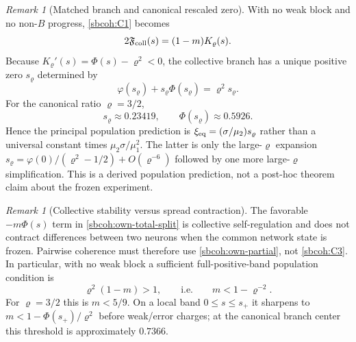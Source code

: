 \documentclass{article} %
\theoremstyle{plain}
\theoremstyle{definition}
\theoremstyle{remark}
\newtheorem{remark}[theorem]{Remark}
\begin{document}
\begin{remark}[Matched branch and canonical rescaled zero]
\label{sbcoh:matched-branch}
With no weak block and no non-$B$ progress, \eqref{sbcoh:C1} becomes
\[
 2\mathfrak F_{\rm coll}(s)=(1-m)K_\varrho(s).
\]
Because
$K_\varrho'(s)=\Phi(s)-\varrho^2<0$, the collective branch has a unique
positive zero $s_\varrho$ determined by
\begin{equation}\label{sbcoh:s-rho}
 \varphi(s_\varrho)+s_\varrho\Phi(s_\varrho)
 =\varrho^2s_\varrho.
\end{equation}
For the canonical ratio $\varrho=3/2$,
\[
 \boxed{s_\varrho\approx0.23419,\qquad
 \Phi(s_\varrho)\approx0.5926.}
\]
Hence the principal population prediction is
$\xi_{\rm eq}=(\sigma/\mu_2)s_\varrho$ rather than a universal constant times
$\mu_2\sigma/\mu_1^2$.  The latter is only the large-$\varrho$ expansion
$s_\varrho=\varphi(0)/(\varrho^2-1/2)+O(\varrho^{-6})$ followed by one more
large-$\varrho$ simplification.  This is a derived population prediction,
not a post-hoc theorem claim about the frozen experiment.
\end{remark}

\begin{remark}[Collective stability versus spread contraction]
\label{sbcoh:two-derivatives}
The favorable $-m\Phi(s)$ term in \eqref{sbcoh:own-total-split} is collective
self-regulation and does not contract differences between two neurons when the
common network state is frozen.  Pairwise coherence must therefore use
\eqref{sbcoh:own-partial}, not \eqref{sbcoh:C3}.  In particular, with no weak
block a sufficient full-positive-band population condition is
\[
 \varrho^2(1-m)>1,
 \qquad\text{i.e.}\qquad
 m<1-\varrho^{-2}.
\]
For $\varrho=3/2$ this is $m<5/9$.  On a local band
$0\le s\le s_+$ it sharpens to
$m<1-\Phi(s_+)/\varrho^2$ before weak/error charges; at the canonical branch
center this threshold is approximately $0.7366$.
\end{remark}
\end{document}
